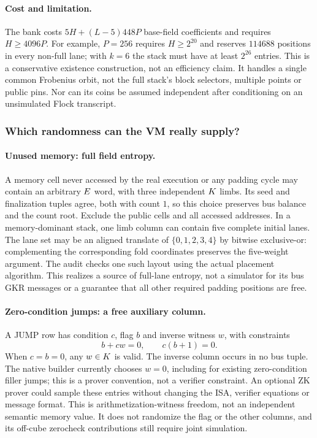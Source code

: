 \paragraph{Cost and limitation.} The bank costs $5H+(L-5)448P$ base-field coefficients and requires $H\ge4096P$. For example, $P=256$ requires $H\ge2^{20}$ and reserves $114688$ positions in every non-full lane; with $k=6$ the stack must have at least $2^{26}$ entries. This is a conservative existence construction, not an efficiency claim. It handles a single common Frobenius orbit, not the full stack's block selectors, multiple points or public pins. Nor can its coins be assumed independent after conditioning on an unsimulated Flock transcript.

\subsubsection{Which randomness can the VM really supply?}

\paragraph{Unused memory: full field entropy.} A memory cell never accessed by the real execution or any padding cycle may contain an arbitrary $E$ word, with three independent $K$ limbs. Its seed and finalization tuples agree, both with count $1$, so this choice preserves bus balance and the count root. Exclude the public cells and all accessed addresses. In a memory-dominant stack, one limb column can contain five complete initial lanes. The lane set may be an aligned translate of $\{0,1,2,3,4\}$ by bitwise exclusive-or: complementing the corresponding fold coordinates preserves the five-weight argument. The audit checks one such layout using the actual placement algorithm. This realizes a source of full-lane entropy, not a simulator for its bus GKR messages or a guarantee that all other required padding positions are free.

\paragraph{Zero-condition jumps: a free auxiliary column.} A JUMP row has condition $c$, flag $b$ and inverse witness $w$, with constraints
\[
 b+cw=0,\qquad c(b+1)=0.
\]
When $c=b=0$, any $w\in K$ is valid. The inverse column occurs in no bus tuple. The native builder currently chooses $w=0$, including for existing zero-condition filler jumps; this is a prover convention, not a verifier constraint. An optional ZK prover could sample these entries without changing the ISA, verifier equations or message format. This is arithmetization-witness freedom, not an independent semantic memory value. It does not randomize the flag or the other columns, and its off-cube zerocheck contributions still require joint simulation.

